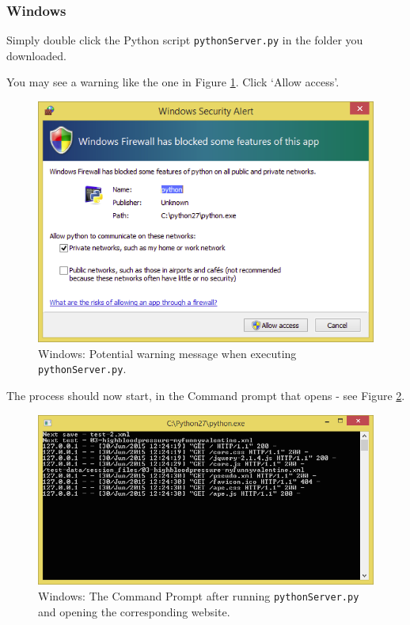\documentclass[11pt, oneside]{article}   	%
\begin{document}
		\subsubsection{Windows}
		
		Simply double click the Python script \texttt{pythonServer.py} in the folder you downloaded. 
		
		You may see a warning like the one in Figure \ref{fig:warning}. Click `Allow access'. 
		
		\begin{figure}[htbp]
                \begin{center}
                \includegraphics[width=.6\textwidth]{warning.png}
                \caption{Windows: Potential warning message when executing \texttt{pythonServer.py}.}
                \label{fig:warning}
                \end{center}
                \end{figure}
                
                The process should now start, in the Command prompt that opens - see Figure \ref{fig:python}. 
                
                \begin{figure}[htbp]
                \begin{center}
                \includegraphics[width=.75\textwidth]{python.png}
                \caption{Windows: The Command Prompt after running \texttt{pythonServer.py} and opening the corresponding website.}
                \label{fig:python}
                \end{center}
                \end{figure}
                
\end{document}
